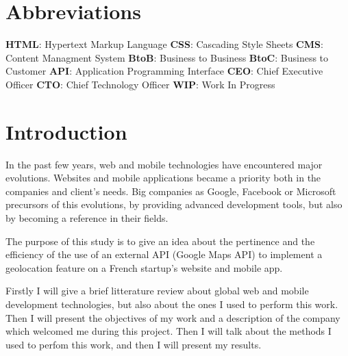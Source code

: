 \documentclass{article}
\begin{document}
        \newpage
        \section*{Abbreviations}

        \textbf{HTML}: Hypertext Markup Language \newline
        \textbf{CSS}: Cascading Style Sheets \newline
        \textbf{CMS}: Content Managment System \newline
        \textbf{BtoB}: Business to Business \newline
        \textbf{BtoC}: Business to Customer \newline
        \textbf{API}: Application Programming Interface \newline
        \textbf{CEO}: Chief Executive Officer \newline
        \textbf{CTO}: Chief Technology Officer \newline
        \textbf{WIP}: Work In Progress

        
        \newpage
        \section{Introduction}
            In the past few years, web and mobile technologies have encountered major evolutions. Websites and mobile applications became a priority both in the companies and client's needs.  Big companies as Google, Facebook or Microsoft
            precursors of this evolutions, by providing advanced development tools, but also by becoming a reference in their fields.
            
            \vspace{1cm}
            
            The purpose of this study is to give an idea
            about the pertinence and the efficiency of the use of an external API (Google Maps API) to implement a geolocation feature on 
            a French startup's website and mobile app.
            

            \vspace{1cm}

            Firstly I will give a brief litterature review about global web and mobile development technologies, but also about the ones I used
            to perform this work. Then I will present the objectives of my work and a description of the company which welcomed me during this project.
            Then I will talk about the methods I used to perfom this work, and then I will present my results.
\end{document}
